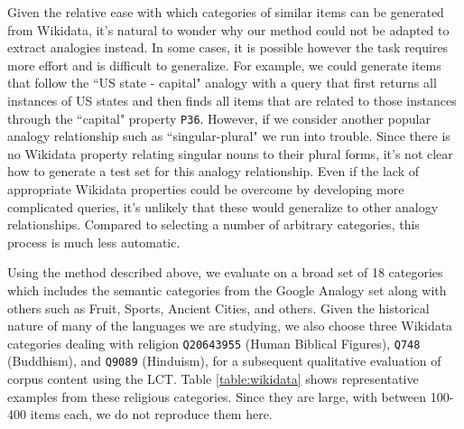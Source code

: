 \documentclass[11pt,a4paper]{article}
\newcommand{\fixme}[1]{{\color{red}\itshape \textbf{FIXME:} {#1}}}
\begin{document}
Given the relative ease with which categories of similar items can be generated from Wikidata, it's natural to wonder why our method could not be adapted  to extract analogies instead. In some cases, it is possible however the task requires more effort and is difficult to generalize. For example, we could generate items that follow the  ``US state - capital" analogy with a query that first returns all instances of US states and then finds all items that are related to those instances through the ``capital" property \texttt{P36}. However, if we consider another popular analogy relationship such as ``singular-plural" we run into trouble. Since there is no Wikidata property relating singular nouns to their plural forms, it's not clear how to generate a test set for this analogy relationship. Even if the lack of appropriate  Wikidata properties could be overcome by developing more complicated queries, it's unlikely that these would generalize to other analogy relationships. Compared to selecting a number of arbitrary categories, this process is much less automatic.  


Using the method described above, we evaluate on a broad set of 18 categories which includes the semantic categories from the Google Analogy set along with others such as Fruit, Sports, Ancient Cities, and others. Given the historical nature of many of the languages we are studying, we also choose three Wikidata categories dealing with religion
\texttt{Q20643955} (Human Biblical Figures),
\texttt{Q748} (Buddhism),
and \texttt{Q9089} (Hinduism), for a subsequent qualitative evaluation of corpus content using the LCT.
Table \ref{table:wikidata} shows representative examples from these religious categories.
Since they are large, with between 100-400 items each, we do not reproduce them here.

%
%
%
\end{document}
